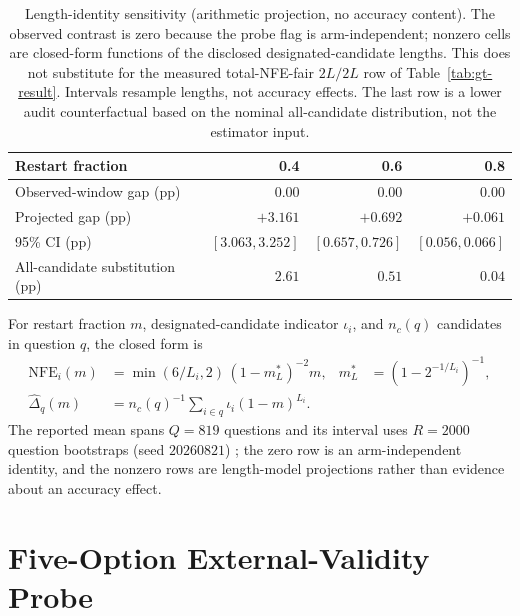 \begin{table}[H]
\centering
\footnotesize
\setlength{\tabcolsep}{5pt}
\caption{Length-identity sensitivity (arithmetic projection, no accuracy
content).  The observed contrast is zero because the probe flag is
arm-independent; nonzero cells are closed-form functions of the disclosed
designated-candidate lengths.  This does not substitute for the measured
total-NFE-fair $2L/2L$ row of Table~\ref{tab:gt-result}.  Intervals resample lengths, not
accuracy effects.  The last row is a lower audit counterfactual based on the
nominal all-candidate distribution, not the estimator input.}
\label{tab:nfe-sensitivity}
\begin{tabular}{@{}lrrr@{}}
\toprule
Restart fraction & 0.4 & 0.6 & 0.8 \\
\midrule
Observed-window gap (pp) & 0.00 & 0.00 & 0.00 \\
Projected gap (pp) & $+3.161$ & $+0.692$ & $+0.061$ \\
95\% CI (pp) & $[3.063,3.252]$ & $[0.657,0.726]$ & $[0.056,0.066]$ \\
\midrule
All-candidate substitution (pp) & $2.61$ & $0.51$ & $0.04$ \\
\bottomrule
\end{tabular}
\end{table}

For restart fraction $m$, designated-candidate indicator $\iota_i$, and
$n_c(q)$ candidates in question $q$, the closed form is
\begin{align*}
\mathrm{NFE}_i(m)&=\min(6/L_i,2)\,(1-m_L^*)^{-2}m,
&m_L^*&=(1-2^{-1/L_i})^{-1},\\
\widehat\Delta_q(m)&=n_c(q)^{-1}\sum_{i\in q}\iota_i(1-m)^{L_i}.&&
\end{align*}
The reported mean spans $Q{=}819$ questions and its interval uses $R{=}2000$
question bootstraps (seed $20260821$) \citep{efron1994bootstrap}; the zero row
is an arm-independent identity, and the nonzero rows are length-model
projections rather than evidence about an accuracy effect.

\section{Five-Option External-Validity Probe}
\label{app:5option}

